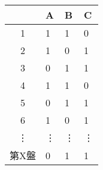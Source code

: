 %
%
%

\begin{tabular}{| c| l | l | l |}
   \hline
  	 & A& B &C \\%
   \hline
   1       & 1 & 1 	&0 \\
   2	&  1&0	&1\\
   3	& 0 &1	&1\\
   4 	& 1 &1	&0\\
   5	& 0 &1	&1\\
   6	& 1 &0	&1\\
  \vdots &\vdots  &\vdots	&\vdots\\
 第X盤 & 0 &1	&1\\
        \hline
   
\end{tabular}



%